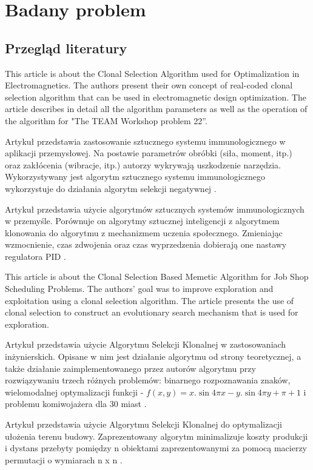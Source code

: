 \documentclass[a4paper]{article}
\begin{document}
\section{Badany problem}
\subsection{Przegląd literatury}
This article is about the Clonal Selection Algorithm used for Optimalization in Electromagnetics. The authors present their own concept of real-coded clonal selection algorithm that can be used in electromagnetic design optimization. The article describes in detail all the algorithm parameters as well as the operation of the algorithm for "The TEAM Workshop problem 22”\cite{1430953}.



Artykuł przedstawia zastosowanie sztucznego systemu immunologicznego w aplikacji przemysłowej. Na postawie parametrów obróbki (siła, moment, itp.) oraz zakłócenia (wibracje, itp.) autorzy wykrywają uszkodzenie narzędzia. Wykorzystywany jest algorytm sztucznego systemu immunologicznego wykorzystuje do działania algorytm selekcji negatywnej \cite{dasgupta1999artificial}.


Artykuł przedstawia użycie algorytmów sztucznych systemów immunologicznych w przemyśle. Porównuje on algorytmy sztucznej inteligencji z algorytmem klonowania do algorytmu z mechanizmem uczenia społecznego. Zmieniając wzmocnienie, czas zdwojenia oraz czas wyprzedzenia dobierają one nastawy regulatora PID \cite{wang_artificial_2017}.


This article is about the Clonal Selection Based Memetic Algorithm for Job Shop Scheduling Problems. The authors' goal was to improve exploration and exploitation using a clonal selection algorithm. The article presents the use of clonal selection to construct an evolutionary search mechanism that is used for exploration\cite{yang2008clonal}.

Artykuł przedstawia użycie Algorytmu Selekcji Klonalnej w zastosowaniach inżynierskich. Opisane w nim jest działanie algorytmu od strony teoretycznej, a także działanie zaimplementowanego przez autorów algorytmu przy rozwiązywaniu trzech różnych problemów: binarnego rozpoznawania znaków, wielomodalnej optymalizacji funkcji -
$f(x, y) = x.\sin{4 \pi x} - y.\sin{4 \pi y + \pi} + 1$
i problemu komiwojażera dla 30 miast \cite{de_castro}.


Artykuł przedstawia użycie Algorytmu Selekcji Klonalnej do optymalizacji ułożenia terenu budowy. Zaprezentowany algorytm minimalizuje koszty produkcji i dystans przebyty pomiędzy n obiektami zaprezentowanymi za pomocą macierzy permutacji o wymiarach n x n \cite{WANG2016267}.
\end{document}
